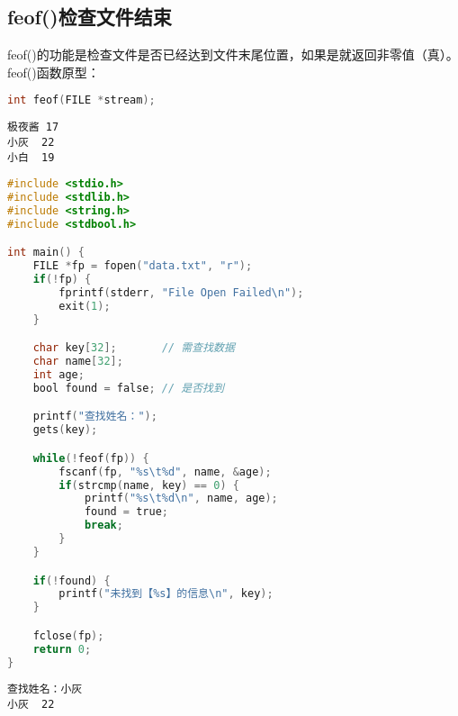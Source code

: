\subsection{feof()检查文件结束}

feof()的功能是检查文件是否已经达到文件末尾位置，如果是就返回非零值（真）。\\

feof()函数原型：

\vspace{-0.5cm}

\begin{lstlisting}[language=C]
int feof(FILE *stream);
\end{lstlisting}

\vspace{0.5cm}


\begin{lstlisting}[title=data.txt]
极夜酱	17
小灰	22
小白	19
\end{lstlisting}

\begin{lstlisting}[language=C, title=feof.c]
#include <stdio.h>
#include <stdlib.h>
#include <string.h>
#include <stdbool.h>

int main() {
    FILE *fp = fopen("data.txt", "r");
    if(!fp) {
        fprintf(stderr, "File Open Failed\n");
        exit(1);
    }

    char key[32];       // 需查找数据
    char name[32];
    int age;
    bool found = false; // 是否找到

    printf("查找姓名：");
    gets(key);

    while(!feof(fp)) {
        fscanf(fp, "%s\t%d", name, &age);
        if(strcmp(name, key) == 0) {
            printf("%s\t%d\n", name, age);
            found = true;
            break;
        }
    }

    if(!found) {
        printf("未找到【%s】的信息\n", key);
    }

    fclose(fp);
    return 0;
}
\end{lstlisting}

\begin{tcolorbox}
	\begin{verbatim}
查找姓名：小灰
小灰	22
	\end{verbatim}
\end{tcolorbox}

\newpage